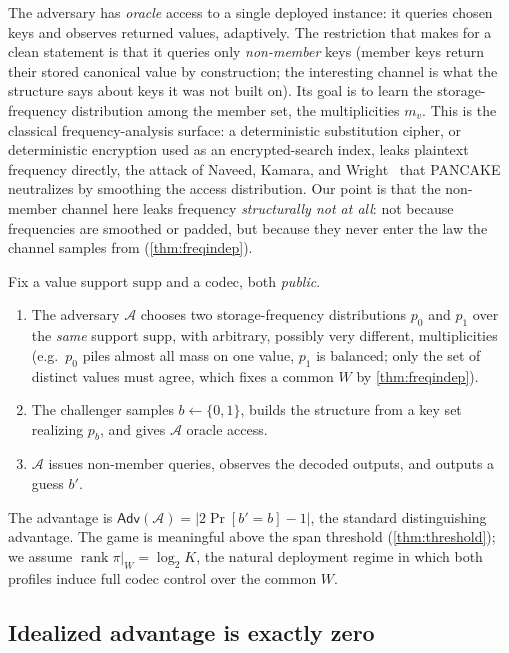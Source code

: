 \documentclass[acmsmall,review]{acmart}
\DeclareMathOperator{\rank}{rank}
\newcommand{\W}{W}                          %
\newcommand{\proj}{\pi}                     %
\newcommand{\supp}{\mathrm{supp}}           %
\newcommand{\Adv}{\mathsf{Adv}}             %
\begin{document}
The adversary has \emph{oracle} access to a single deployed instance: it queries chosen
keys and observes returned values, adaptively. The restriction that makes for a clean
statement is that it queries only \emph{non-member} keys (member keys return their stored
canonical value by construction; the interesting channel is what the structure says about
keys it was not built on). Its goal is to learn the storage-frequency distribution among
the member set, the multiplicities $m_v$. This is the classical frequency-analysis
surface: a deterministic substitution cipher, or deterministic encryption used as an
encrypted-search index, leaks plaintext frequency directly, the attack of Naveed, Kamara,
and Wright~\cite{naveed2015inference} that PANCAKE~\cite{grubbs2020pancake} neutralizes
by smoothing the access distribution. Our point is that the non-member channel here leaks
frequency \emph{structurally not at all}: not because frequencies are smoothed or padded,
but because they never enter the law the channel samples from (\cref{thm:freqindep}).

\begin{definition}
\label{def:freqdist}
Fix a value support $\supp$ and a codec, both \emph{public}.
\begin{enumerate}
  \item The adversary $\mathcal{A}$ chooses two storage-frequency distributions $p_0$
  and $p_1$ over the \emph{same} support $\supp$, with arbitrary, possibly very
  different, multiplicities (e.g.\ $p_0$ piles almost all mass on one value, $p_1$ is
  balanced; only the set of distinct values must agree, which fixes a common $\W$ by
  \cref{thm:freqindep}).
  \item The challenger samples $b \leftarrow \{0,1\}$, builds the structure from a key
  set realizing $p_b$, and gives $\mathcal{A}$ oracle access.
  \item $\mathcal{A}$ issues non-member queries, observes the decoded outputs, and outputs
  a guess $b'$.
\end{enumerate}
The advantage is $\Adv(\mathcal{A}) = |2\Pr[b' = b] - 1|$, the standard distinguishing
advantage. The game is meaningful above the span threshold (\cref{thm:threshold}); we
assume $\rank \proj|_{\W} = \log_2 K$, the natural deployment regime in which both
profiles induce full codec control over the common $\W$.
\end{definition}

\subsection{Idealized advantage is exactly zero}
\end{document}
